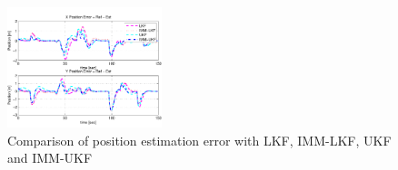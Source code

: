 \documentclass[letterpaper, 10 pt, conference]{ieeeconf}
\begin{document}
	
	
	
	\begin{figure}
		\centering
		\includegraphics[width=0.4\textwidth]{figures/pos_error}
		\caption{Comparison of position estimation error with LKF, IMM-LKF, UKF and IMM-UKF}
		\label{fig:track_pos}
	\end{figure}   
	
\end{document}
